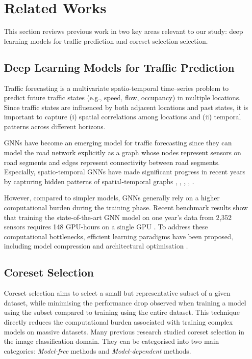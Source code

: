 \section{Related Works}
This section reviews previous work in two key areas relevant to our study: deep learning models for traffic prediction and coreset selection selection.

\subsection{Deep Learning Models for Traffic Prediction}\label{sec:traffic_forecasting}
Traffic forecasting is a multivariate spatio-temporal time–series problem to predict future traffic states (e.g., speed, flow, occupancy) in multiple locations. Since traffic states are influenced by both adjacent locations and past states, it is important to capture (i) spatial correlations among locations and (ii) temporal patterns across different horizons.

GNNs have become an emerging model for traffic forecasting since they can model the road network explicitly as a graph whose nodes represent sensors on road segments and edges represent connectivity between road segments. Especially, spatio-temporal GNNs have made significant progress in recent years by capturing hidden patterns of spatial-temporal graphs \cite{wu_graph_2019}, \cite{yu_spatio-temporal_2018}, \cite{cui_traffic_2019}, \cite{li_dynamic_2023}, \cite{bai_adaptive_2020}.


However, compared to simpler models, GNNs generally rely on a higher computational burden during the training phase. Recent benchmark results show that training the state-of-the-art GNN model on one year’s data from 2,352 sensors requires 148 GPU-hours on a single GPU \cite{liu_largest_2023}. To address these computational bottlenecks, efficient learning paradigms have been proposed, including model compression and architectural optimisation \cite{zheng_lightcast_2024, zhang_efficient_2025}. 

\subsection{Coreset Selection}
Coreset selection aims to select a small but representative subset of a given dataset, while minimising the performance drop observed when training a model using the subset compared to training using the entire dataset. This technique directly reduces the computational burden associated with training complex models on massive datasets. Many previous research studied coreset selection in the image classification domain. They can be categorised into two main categories: \textit{Model-free} methods and \textit{Model-dependent} methods.

